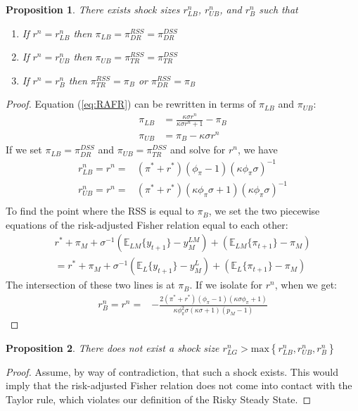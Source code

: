 \documentclass[11pt]{article}
\newtheorem{proposition}{Proposition}
\begin{document}
	\begin{proposition}\label{prop:cSHOCKS}
		There exists shock sizes $r^n_{LB}$, $r^n_{UB}$, and $r^n_{B}$ such that 
		\begin{enumerate}
			\item [i.] If $r^n = r^n_{LB}$ then $\pi_{LB} = \pi^{RSS}_{DR} = \pi^{DSS}_{DR}$ 
			\item [ii.] If $r^n = r^n_{UB}$ then $\pi_{UB} = \pi^{RSS}_{TR} = \pi^{DSS}_{TR}$
			\item [iii.] If $r^n = r^n_{B}$ then $\pi^{RSS}_{TR} = \pi_B$ or $\pi^{RSS}_{DR} = \pi_B$
		\end{enumerate}
	\end{proposition}
	\begin{proof}
		Equation (\ref{eq:RAFR}) can be rewritten in terms of $\pi_{LB}$ and $\pi_{UB}$:
		\begin{align*}
			\pi_{LB} &= \frac{\kappa\sigma r^n}{\kappa\sigma r^n + 1} - \pi_{B}\\
			\pi_{UB} &= \pi_{B} - \kappa\sigma r^n 	
		\end{align*}
		If we set $\pi_{LB} = \pi^{DSS}_{DR}$ and $\pi_{UB} = \pi^{DSS}_{TR}$ and solve for $r^n$, we have 
		\begin{align*}
			r^n_{LB} = r^n = &\left(\pi^*+r^* \right)\left(\phi_{\pi} - 1\right)\left(\kappa\phi_{\pi}\sigma\right)^{-1} \\
			r^n_{UB} = r^n = &\left(\pi^* + r^*\right) \left(\kappa\phi_{\pi}\sigma  + 1\right)\left(\kappa\phi_{\pi}\sigma\right)^{-1}\\
		\end{align*}
		To find the point where the RSS is equal to $\pi_{B} $, we set the two piecewise equations of the risk-adjusted Fisher relation equal to each other:
		\begin{align*}
			r^* + \pi_M + \sigma^{-1}\left(\mathbb{E}_{LM}\{y_{t+1}\} - y_M^{LM}\right) + \left(\mathbb{E}_{LM}\{\pi_{t+1}\} - \pi_M\right) \\ 
			= r^* + \pi_M + \sigma^{-1}\left(\mathbb{E}_{L}\{y_{t+1}\} - y_M^{L}\right) + \left(\mathbb{E}_{L}\{\pi_{t+1}\} - \pi_M\right)
		\end{align*}
		The intersection of these two lines is at $\pi_{B}$. If we isolate for $r^n$, when we get: 
		\begin{align*}
			r^n_{B} = r^n = &-\frac{2(\pi^* + r^*)(\phi_{\pi}-1)(\kappa\sigma\phi_{\pi}+1)} {\kappa\phi_{\pi}^2\sigma(\kappa\sigma+1)(p_M-1)}
		\end{align*}
	\end{proof}
	\begin{proposition}
		There does not exist a shock size $r^n_{LG} > \text{max}\left\{r^n_{LB}, r^n_{UB}, r^n_{B}\right\}$
	\end{proposition}
	\begin{proof}
		Assume, by way of contradiction, that such a shock exists. This would imply that the risk-adjusted Fisher relation does not come into contact with the Taylor rule, which violates our definition of the Risky Steady State. 
	\end{proof}	
	
\end{document}
